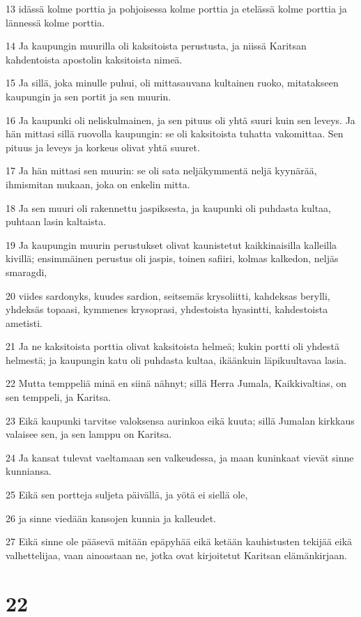\par 13 idässä kolme porttia ja pohjoisessa kolme porttia ja etelässä kolme porttia ja lännessä kolme porttia.
\par 14 Ja kaupungin muurilla oli kaksitoista perustusta, ja niissä Karitsan kahdentoista apostolin kaksitoista nimeä.
\par 15 Ja sillä, joka minulle puhui, oli mittasauvana kultainen ruoko, mitatakseen kaupungin ja sen portit ja sen muurin.
\par 16 Ja kaupunki oli neliskulmainen, ja sen pituus oli yhtä suuri kuin sen leveys. Ja hän mittasi sillä ruovolla kaupungin: se oli kaksitoista tuhatta vakomittaa. Sen pituus ja leveys ja korkeus olivat yhtä suuret.
\par 17 Ja hän mittasi sen muurin: se oli sata neljäkymmentä neljä kyynärää, ihmismitan mukaan, joka on enkelin mitta.
\par 18 Ja sen muuri oli rakennettu jaspiksesta, ja kaupunki oli puhdasta kultaa, puhtaan lasin kaltaista.
\par 19 Ja kaupungin muurin perustukset olivat kaunistetut kaikkinaisilla kalleilla kivillä; ensimmäinen perustus oli jaspis, toinen safiiri, kolmas kalkedon, neljäs smaragdi,
\par 20 viides sardonyks, kuudes sardion, seitsemäs krysoliitti, kahdeksas berylli, yhdeksäs topaasi, kymmenes krysoprasi, yhdestoista hyasintti, kahdestoista ametisti.
\par 21 Ja ne kaksitoista porttia olivat kaksitoista helmeä; kukin portti oli yhdestä helmestä; ja kaupungin katu oli puhdasta kultaa, ikäänkuin läpikuultavaa lasia.
\par 22 Mutta temppeliä minä en siinä nähnyt; sillä Herra Jumala, Kaikkivaltias, on sen temppeli, ja Karitsa.
\par 23 Eikä kaupunki tarvitse valoksensa aurinkoa eikä kuuta; sillä Jumalan kirkkaus valaisee sen, ja sen lamppu on Karitsa.
\par 24 Ja kansat tulevat vaeltamaan sen valkeudessa, ja maan kuninkaat vievät sinne kunniansa.
\par 25 Eikä sen portteja suljeta päivällä, ja yötä ei siellä ole,
\par 26 ja sinne viedään kansojen kunnia ja kalleudet.
\par 27 Eikä sinne ole pääsevä mitään epäpyhää eikä ketään kauhistusten tekijää eikä valhettelijaa, vaan ainoastaan ne, jotka ovat kirjoitetut Karitsan elämänkirjaan.

\chapter{22}

